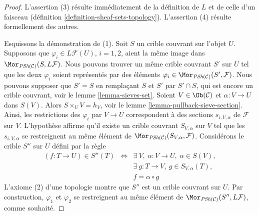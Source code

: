 \begin{proof}
L'assertion (3) résulte immédiatement de la définition de $L$ et
de celle d'un faisceau (définition \ref{definition-sheaf-sets-topology}).
L'assertion (4) résulte formellement des autres.

\medskip\noindent
Esquissons la démonstration de (1). Soit $S$ un crible couvrant
sur l'objet $U$. Supposons que $\varphi_i \in L\mathcal{F}(U)$,
$i = 1, 2$, aient la même image dans
$\Mor_{\textit{PSh}(\mathcal{C})}(S, L\mathcal{F})$.
Nous pouvons trouver un même crible couvrant $S'$ sur $U$
tel que les deux $\varphi_i$ soient représentés par des éléments
$\varphi_i \in \Mor_{\textit{PSh}(\mathcal{C})}(S', \mathcal{F})$.
Nous pouvons supposer que $S' = S$ en remplaçant $S$ et $S'$ par
$S' \cap S$, qui est encore un crible couvrant, voir le lemme \ref{lemma-sieves-set}.
Soient $V\in \Ob(\mathcal{C})$ et
$\alpha : V \to U$ dans $S(V)$.
Alors $S \times_U V = h_V$,
voir le lemme \ref{lemma-pullback-sieve-section}. Ainsi, les restrictions
des $\varphi_i$ par $V \to U$ correspondent à des sections $s_{i, V, \alpha}$
de $\mathcal{F}$ sur $V$. L'hypothèse affirme qu'il existe
un crible couvrant $S_{V, \alpha}$ sur $V$ tel que
les $s_{i, V, \alpha}$ se restreignent au même élément de
$\Mor_{\textit{PSh}(\mathcal{C})}(S_{V, \alpha}, \mathcal{F})$.
Considérons le crible $S''$ sur $U$ défini par la règle
\begin{eqnarray}
\label{equation-S-prime-prime}
(f : T \to U) \in S''(T)
& \Leftrightarrow &
\exists\ V , \ \alpha : V \to U, \ \alpha \in S(V), \nonumber \\
& &
\exists\ g : T \to V, \ g \in S_{V, \alpha}(T), \\
& &
f = \alpha \circ g \nonumber
\end{eqnarray}
L'axiome (2) d'une topologie montre que $S''$ est un crible
couvrant sur $U$. Par construction, $\varphi_1$
et $\varphi_2$ se restreignent au même élément de
$\Mor_{\textit{PSh}(\mathcal{C})}(S'', L\mathcal{F})$,
comme souhaité.


\end{proof}
